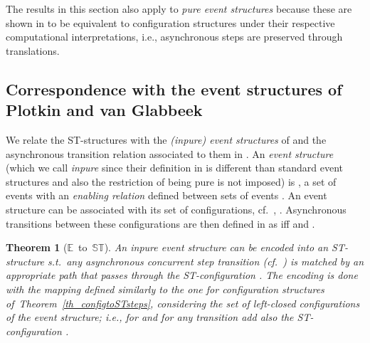 \documentclass[submission,copyright,creativecommons]{eptcs}
\newtheorem{theorem}{Theorem}[section]
\newtheorem{proposition}[theorem]{Proposition}
\newenvironment{proof}[1][\!\!\,]{\vspace{1ex}\noindent\textbf{Proof #1: }}{\hfill\vspace{2ex}}
\newcommand{\cp}[1]{}
\newcommand\allST{\ensuremath{\mathbb{ST}}}
\newcommand\allEv{\ensuremath{\mathbb{E}}}
\begin{document}
The results in this section also apply to \textit{pure event structures} because these are shown in \cite[Th.2 and Prop.2.2]{GlabbeekP09configStruct} to be equivalent to configuration structures under their respective computational interpretations, i.e., asynchronous steps are preserved through translations.

\cp{
\begin{proposition}
Two stable and adjacent-closed ST-structures are hh-bisimilar iff their corresponding (cf.~Proposition~\ref{prop_stableSTconf}) stable configuration structures are, cf.~\cite[def.9.6]{GlabbeekG01refinement}.
\end{proposition}

\begin{proof}
The proof is tedious.
\end{proof}

}

\subsection{Correspondence with the event structures of Plotkin and van Glabbeek}

We relate the ST-structures with the \textit{(inpure) event structures} of \cite[Def.1.3]{GlabbeekP09configStruct} and the asynchronous transition relation associated to them in \cite[Def.2.3]{GlabbeekP09configStruct}.
An \textit{event structure} (which we call \textit{inpure} since their definition in \cite[Def.1.3]{GlabbeekP09configStruct} is different than standard event structures and also the restriction of being pure is not imposed) is , a set of events with an \textit{enabling relation} defined between sets of events . An event structure can be associated with its set of configurations, cf.\ \cite[Def.1.4]{GlabbeekP09configStruct}, . Asynchronous transitions between these configurations are then defined in \cite[Def.2.3]{GlabbeekP09configStruct} as  iff  and .

\begin{theorem}[\allEv\ to\ \allST]\label{th_inpureEv_to_ST}
An inpure event structure can be encoded into an ST-structure s.t.\ any asynchronous concurrent step transition (cf.\ \cite[Def.2.3]{GlabbeekP09configStruct})  is matched by an appropriate path that passes through the ST-configu\-ration .
The encoding is done with the mapping  defined similarly to the one for configuration structures of~Theorem~\ref{th_configtoSTsteps}, considering the set  of left-closed configurations \cite[Def.1.4]{GlabbeekP09configStruct} of the event structure; i.e.,  for  and for any transition  add also the ST-configuration .
\end{theorem}
\end{document}
